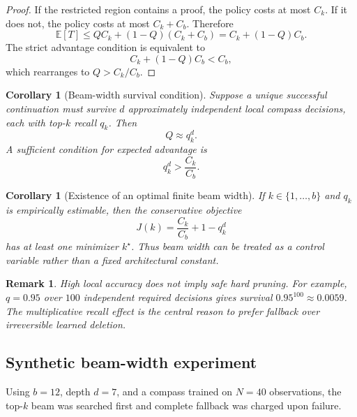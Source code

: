 \documentclass[11pt]{article}
\newtheorem{corollary}[theorem]{Corollary}
\newtheorem{remark}[theorem]{Remark}
\newcommand{\E}{\mathbb{E}}
\begin{document}
\begin{proof}
If the restricted region contains a proof, the policy costs at most \(C_k\). If it does not, the policy costs at most \(C_k+C_b\). Therefore
\[
\E[T]\le Q C_k+(1-Q)(C_k+C_b)
= C_k+(1-Q)C_b.
\]
The strict advantage condition is equivalent to
\[
C_k+(1-Q)C_b<C_b,
\]
which rearranges to \(Q>C_k/C_b\).
\end{proof}

\begin{corollary}[Beam-width survival condition]
Suppose a unique successful continuation must survive \(d\) approximately independent local compass decisions, each with top-\(k\) recall \(q_k\). Then
\[
Q\approx q_k^d.
\]
A sufficient condition for expected advantage is
\[
q_k^d>\frac{C_k}{C_b}.
\]
\end{corollary}

\begin{corollary}[Existence of an optimal finite beam width]
If \(k\in\{1,\ldots,b\}\) and \(q_k\) is empirically estimable, then the conservative objective
\[
J(k)=\frac{C_k}{C_b}+1-q_k^d
\]
has at least one minimizer \(k^\star\). Thus beam width can be treated as a control variable rather than a fixed architectural constant.
\end{corollary}

\begin{remark}
High local accuracy does not imply safe hard pruning. For example, \(q=0.95\) over \(100\) independent required decisions gives survival \(0.95^{100}\approx0.0059\). The multiplicative recall effect is the central reason to prefer fallback over irreversible learned deletion.
\end{remark}

\subsection{Synthetic beam-width experiment}

Using \(b=12\), depth \(d=7\), and a compass trained on \(N=40\) observations, the top-\(k\) beam was searched first and complete fallback was charged upon failure.
\end{document}
